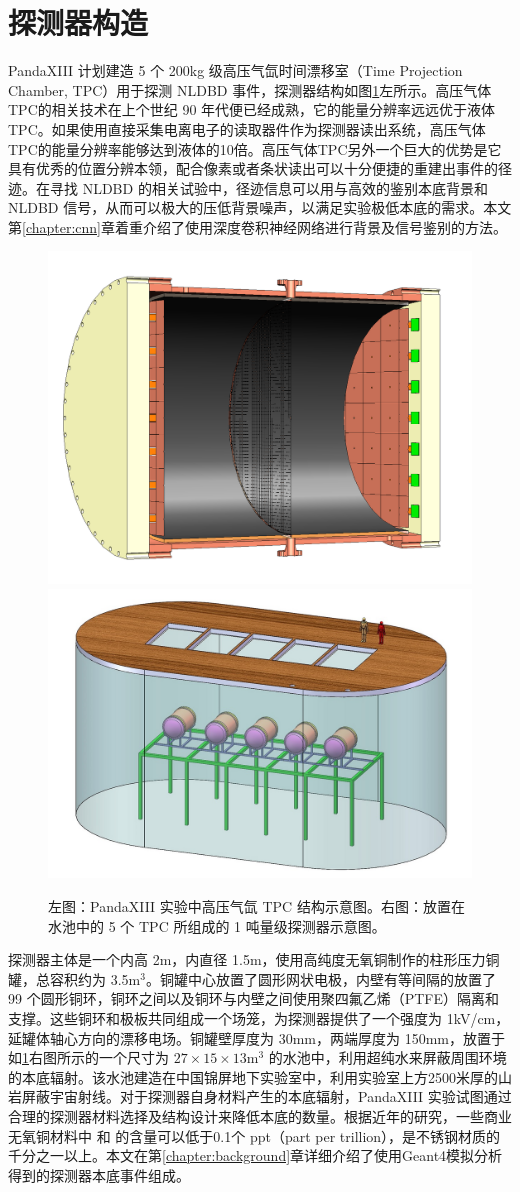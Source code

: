 \section{探测器构造}
\label{section:detector}

PandaXIII 计划建造 5 个 200kg 级高压气氙时间漂移室（Time Projection Chamber, TPC）用于探测 NLDBD 事件，探测器结构如图\ref{fig:detector}左所示。高压气体TPC的相关技术在上个世纪 90 年代便已经成熟，它的能量分辨率远远优于液体TPC。如果使用直接采集电离电子的读取器件作为探测器读出系统，高压气体TPC的能量分辨率能够达到液体的10倍。高压气体TPC另外一个巨大的优势是它具有优秀的位置分辨本领，配合像素或者条状读出可以十分便捷的重建出事件的径迹。在寻找 NLDBD 的相关试验中，径迹信息可以用与高效的鉴别本底背景和 NLDBD 信号，从而可以极大的压低背景噪声，以满足实验极低本底的需求。本文第\ref{chapter:cnn}章着重介绍了使用深度卷积神经网络进行背景及信号鉴别的方法。

\begin{figure}[tbp]
    \centering
    \includegraphics[width=0.4\columnwidth]{pic/fig1.png}
    \includegraphics[width=0.4\columnwidth]{pic/fig2.jpg}
    \caption{左图：PandaXIII 实验中高压气氙 TPC 结构示意图。右图：放置在水池中的 5 个 TPC 所组成的 1 吨量级探测器示意图。\supercite{cdr}}
    \label{fig:detector}
\end{figure}
    
探测器主体是一个内高 2m，内直径 1.5m，使用高纯度无氧铜制作的柱形压力铜罐，总容积约为 3.5m$^3$。铜罐中心放置了圆形网状电极，内壁有等间隔的放置了 99 个圆形铜环，铜环之间以及铜环与内壁之间使用聚四氟乙烯（PTFE）隔离和支撑。这些铜环和极板共同组成一个场笼，为探测器提供了一个强度为 1kV/cm，延罐体轴心方向的漂移电场。铜罐壁厚度为 30mm，两端厚度为 150mm，放置于如\ref{fig:detector}右图所示的一个尺寸为 $27\times15\times13$m$^3$ 的水池中，利用超纯水来屏蔽周围环境的本底辐射。该水池建造在中国锦屏地下实验室中，利用实验室上方2500米厚的山岩屏蔽宇宙射线。对于探测器自身材料产生的本底辐射，PandaXIII 实验试图通过合理的探测器材料选择及结构设计来降低本底的数量。根据近年的研究，一些商业无氧铜材料中 \utte 和 \thttt 的含量可以低于0.1个 ppt（part per trillion）\supercite{abgrall2016majorana}，是不锈钢材质的千分之一以上。本文在第\ref{chapter:background}章详细介绍了使用Geant4模拟分析得到的探测器本底事件组成。

